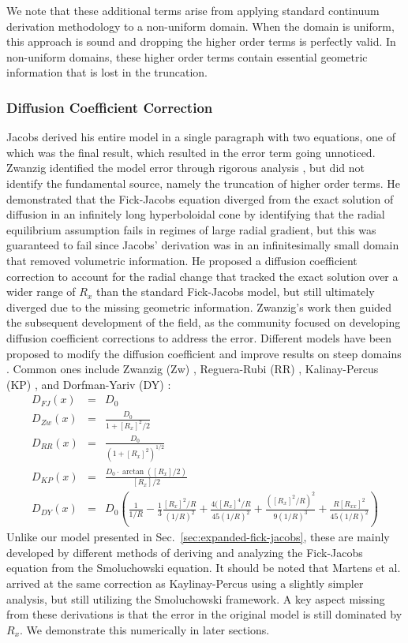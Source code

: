 \documentclass[11pt]{article}
\begin{document}
We note that these additional terms arise from applying standard continuum derivation methodology to a non-uniform domain. When the domain is uniform, this approach is sound and dropping the higher order terms is perfectly valid. In non-uniform domains, these higher order terms contain essential geometric information that is lost in the truncation.


\subsubsection{Diffusion Coefficient Correction}

Jacobs derived his entire model in a single paragraph with two equations, one of which was the final result, which resulted in the error term going unnoticed. Zwanzig identified the model error through rigorous analysis \cite{Zwanzig1992}, but did not identify the fundamental source, namely the truncation of higher order terms. He demonstrated that the Fick-Jacobs equation diverged from the exact solution of diffusion in an infinitely long hyperboloidal cone by identifying that the radial equilibrium assumption fails in regimes of large radial gradient, but this was guaranteed to fail since Jacobs' derivation was in an infinitesimally small domain that removed volumetric information. He proposed a diffusion coefficient correction to account for the radial change that tracked the exact solution over a wider range of $R_x$ than the standard Fick-Jacobs model, but still ultimately diverged due to the missing geometric information. Zwanzig's work then guided the subsequent development of the field, as the community focused on developing diffusion coefficient corrections to address the error. Different models have been proposed to modify the diffusion coefficient and improve results on steep domains \cite{BDB2015}. Common ones include Zwanzig (Zw) \cite{Zwanzig1992}, Reguera-Rubi (RR) \cite{RR01}, Kalinay-Percus (KP) \cite{KP06}, and Dorfman-Yariv (DY) \cite{DY2014}:
\begin{eqnarray}
    D_{FJ}(x) &=& D_0 \\
    D_{Zw}(x) &=& \frac{D_0}{1 + [R_x]^2/2} \\
    D_{RR}(x) &=& \frac{D_0}{(1 + [R_x]^2)^{1/2}} \\
    D_{KP}(x) &=& \frac{D_0 \cdot \arctan([R_x]/2)}{[R_x]/2} \\
    D_{DY}(x) &=& D_0 \left( \frac{1}{1/R} - \frac{1}{3}\frac{[R_x]^2/R}{(1/R)^2} + \frac{4([R_x]^4/R}{45(1/R)^2} + \frac{([R_x]^2/R)^2}{9(1/R)^3} + \frac{R[R_{xx}]^2}{45(1/R)^2} \right)
\end{eqnarray}
Unlike our model presented in Sec.~\ref{sec:expanded-fick-jacobs}, these are mainly developed by different methods of deriving and analyzing the Fick-Jacobs equation from the Smoluchowski equation. It should be noted that Martens et al. \cite{Martens2011} arrived at the same correction as Kaylinay-Percus using a slightly simpler analysis, but still utilizing the Smoluchowski framework. A key aspect missing from these derivations is that the error in the original model is still dominated by $R_x$. We demonstrate this numerically in later sections.
\end{document}
